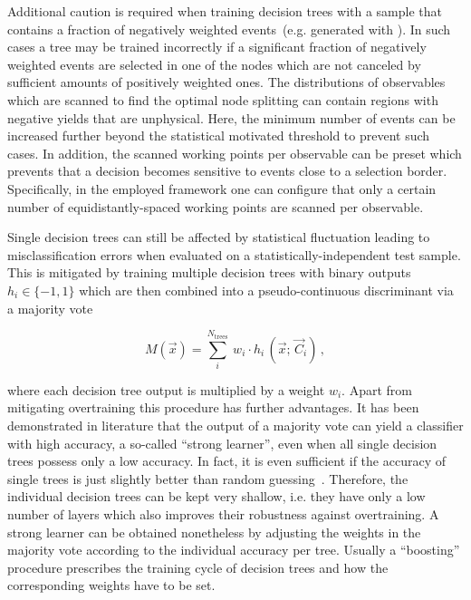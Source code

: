 Additional caution is required when training decision trees with a sample that contains a fraction of negatively weighted events~(e.g. generated with \MGAMC). In such cases a tree may be trained incorrectly if a significant fraction of negatively weighted events are selected in one of the nodes which are not canceled by sufficient amounts of positively weighted ones. The distributions of observables which are scanned to find the optimal node splitting can contain regions with negative yields that are unphysical. Here, the minimum number of events can be increased further beyond the statistical motivated threshold to prevent such cases. In addition, the scanned working points per observable can be preset which prevents that a decision becomes sensitive to events close to a selection border. Specifically, in the employed \TMVA framework one can configure that only a certain number of equidistantly-spaced working points are scanned per observable.
 
Single decision trees can still be affected by statistical fluctuation leading to misclassification errors when evaluated on a statistically-independent test sample. This is mitigated by training multiple decision trees with binary outputs $h_{i}\in\{-1,1\}$ which are then combined into a pseudo-continuous discriminant via a majority vote

\begin{equation}
M(\vec{x})=\sum_{i}^{N_\mathrm{trees}}~w_{i}\cdot h_{i}\,(\vec{x};\,\vec{C}_{i})\,,\label{eq:technique-majority-vote}
\end{equation}

where each decision tree output is multiplied by a weight $w_{i}$. Apart from mitigating overtraining this procedure has further advantages. It has been demonstrated in literature that the output of a majority vote can yield a classifier with high accuracy, a so-called ``strong learner'', even when all single decision trees possess only a low accuracy. In fact, it is even sufficient if the accuracy of single trees is just slightly better than random guessing~\cite{Schapire1990,FREUND1995256}. Therefore, the individual decision trees can be kept very shallow, i.e. they have only a low number of layers which also improves their robustness against overtraining. A strong learner can be obtained nonetheless by adjusting the weights in the majority vote according to the individual accuracy per tree. Usually a ``boosting'' procedure prescribes the training cycle of decision trees and how the corresponding weights have to be set.


